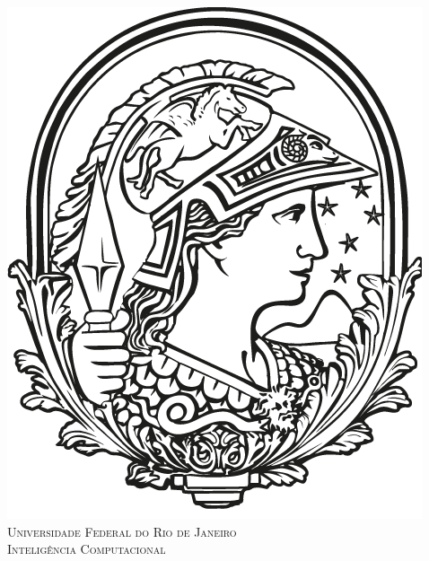 
\begin{titlepage}

\vspace*{\fill}
 
\newcommand{\HRule}{\rule{\linewidth}{0.5mm}} 	%

\center 												%
 

\includegraphics[scale=0.3]{./minerva}\\[1cm] %
 

\textsc{\LARGE Universidade Federal do Rio de Janeiro}\\[1.5cm] %
\textsc{\Large Inteligência Computacional}\\[0.5cm] %


\end{titlepage}
